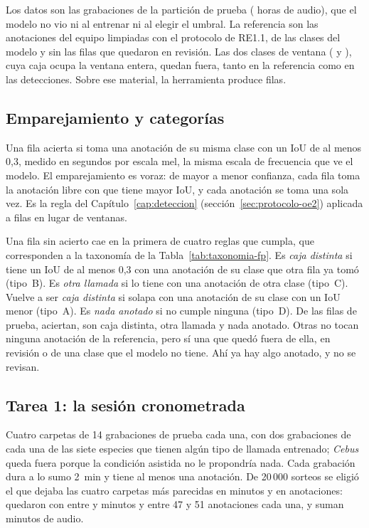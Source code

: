 Los datos son las \uTestRecordings{} grabaciones de la partición de prueba
(\uTestHours{} horas de audio), que el modelo no vio ni al entrenar ni al elegir
el umbral. La referencia son las anotaciones del equipo limpiadas con el protocolo
de RE1.1, de las clases del modelo y sin las filas que quedaron en revisión. Las
dos clases de ventana ( y ), cuya caja ocupa la ventana
entera, quedan fuera, tanto en la referencia como en las detecciones. Sobre ese
material, la herramienta produce \uRows{} filas.

\subsection{Emparejamiento y categorías}

Una fila acierta si toma una anotación de su misma clase con un IoU de al menos
0,3, medido en segundos por escala mel, la misma escala de frecuencia que ve el
modelo. El emparejamiento es voraz: de mayor a menor confianza, cada fila toma la
anotación libre con que tiene mayor IoU, y cada anotación se toma una sola vez.
Es la regla del Capítulo~\ref{cap:deteccion} (sección~\ref{sec:protocolo-oe2})
aplicada a filas en lugar de ventanas.

Una fila sin acierto cae en la primera de cuatro reglas que cumpla, que
corresponden a la taxonomía de la Tabla~\ref{tab:taxonomia-fp}. Es \emph{caja
    distinta} si tiene un IoU de al menos 0,3 con una anotación de su clase que
otra fila ya tomó (tipo~B). Es \emph{otra llamada} si lo tiene con una anotación
de otra clase (tipo~C). Vuelve a ser \emph{caja distinta} si solapa con una
anotación de su clase con un IoU menor (tipo~A). Es \emph{nada anotado} si no
cumple ninguna (tipo~D). De las \uRows{} filas de prueba, \uMatchRows{} aciertan,
\uBoxRows{} son caja distinta, \uLabelRows{} otra llamada y \uNoneRows{} nada
anotado. Otras \uNotReviewed{} no tocan ninguna anotación de la referencia, pero
sí una que quedó fuera de ella, en revisión o de una clase que el modelo no
tiene. Ahí ya hay algo anotado, y no se revisan.

\subsection{Tarea 1: la sesión cronometrada}
\label{sec:diseno-sesion}

 Cuatro carpetas de 14 grabaciones de prueba cada una, con dos
grabaciones de cada una de las siete especies que tienen algún tipo de llamada
entrenado; \textit{Cebus} queda fuera porque la condición asistida no le
propondría nada. Cada grabación dura a lo sumo 2~min y tiene al menos una
anotación. De 20\,000 sorteos se eligió el que dejaba las cuatro carpetas más
parecidas en minutos y en anotaciones: quedaron con entre \uFolderAudioLow{} y
\uFolderAudioHigh{} minutos y entre 47 y 51 anotaciones cada una, y suman
\uSessionMinutes{} minutos de audio.

